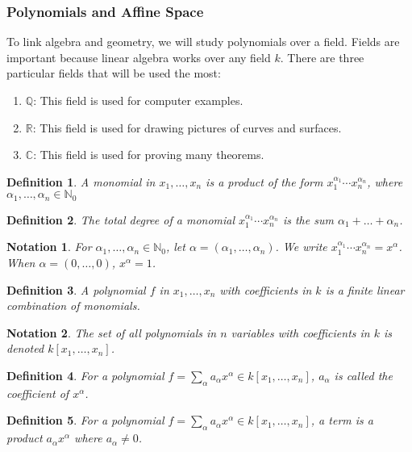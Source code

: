 \documentclass{article}
\theoremstyle{mystyle}
\newtheorem{definition}{Definition}[section]
\newtheorem{notation}{Notation}[section]
\begin{document}
\subsubsection{Polynomials and Affine Space}
To link algebra and geometry, we will study polynomials over a field. Fields are important because linear algebra works over any field $k$. There are three particular fields that will be used the most:
\begin{enumerate}
    \item $\mathbb{Q}$: This field is used for computer examples.
    \item $\mathbb{R}$: This field is used for drawing pictures of curves and surfaces.
    \item $\mathbb{C}$: This field is used for proving many theorems.
\end{enumerate}
\begin{definition}
A monomial in $x_1,\hdots, x_n$ is a product of the form $x_1^{\alpha_1} \cdots x_n^{\alpha_n}$, where $\alpha_1,\hdots, \alpha_n \in \mathbb{N}_0$
\end{definition}
\begin{definition}
The total degree of a monomial $x_1^{\alpha_1}\cdots x_n^{\alpha_n}$ is the sum $\alpha_1+\hdots + \alpha_n$.
\end{definition}
\begin{notation}
For $\alpha_1,\hdots, \alpha_n\in \mathbb{N}_0$, let $\alpha = (\alpha_1,\hdots ,\alpha_n)$. We write $x_1^{\alpha_1} \cdots x_n^{\alpha_n}=x^\alpha$. When $\alpha = (0,\hdots, 0)$, $x^\alpha = 1$.
\end{notation}
\begin{definition}
A polynomial $f$ in $x_1,\hdots, x_n$ with coefficients in $k$ is a finite linear combination of monomials.
\end{definition}
\begin{notation}
The set of all polynomials in $n$ variables with coefficients in $k$ is denoted $k[x_1,\hdots ,x_n]$.
\end{notation}
\begin{definition}
For a polynomial $f = \sum_{\alpha} a_\alpha x^\alpha \in k[x_1,\hdots ,x_n]$, $a_\alpha$ is called the coefficient of $x^\alpha$.
\end{definition}
\begin{definition}
For a polynomial $f=\sum_{\alpha} a_\alpha x^\alpha \in k[x_1,\hdots ,x_n]$, a term is a product $a_\alpha x^\alpha$ where $a_\alpha \ne 0$.
\end{definition}
\end{document}
